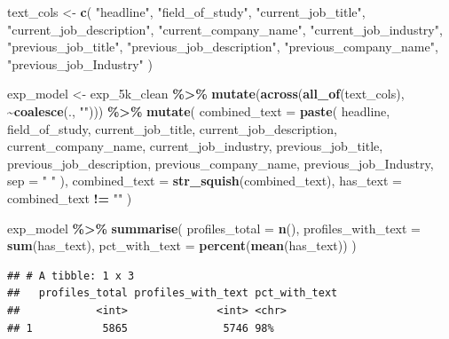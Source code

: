 \documentclass[
]{article}
\newenvironment{Shaded}{\begin{snugshade}}{\end{snugshade}}
\newcommand{\AttributeTok}[1]{\textcolor[rgb]{0.13,0.29,0.53}{#1}}
\newcommand{\FunctionTok}[1]{\textcolor[rgb]{0.13,0.29,0.53}{\textbf{#1}}}
\newcommand{\NormalTok}[1]{#1}
\newcommand{\OtherTok}[1]{\textcolor[rgb]{0.56,0.35,0.01}{#1}}
\newcommand{\SpecialCharTok}[1]{\textcolor[rgb]{0.81,0.36,0.00}{\textbf{#1}}}
\newcommand{\StringTok}[1]{\textcolor[rgb]{0.31,0.60,0.02}{#1}}
\begin{document}
\begin{Shaded}
\begin{Highlighting}[]
\NormalTok{text\_cols }\OtherTok{\textless{}{-}} \FunctionTok{c}\NormalTok{(}
  \StringTok{"headline"}\NormalTok{,}
  \StringTok{"field\_of\_study"}\NormalTok{,}
  \StringTok{"current\_job\_title"}\NormalTok{,}
  \StringTok{"current\_job\_description"}\NormalTok{,}
  \StringTok{"current\_company\_name"}\NormalTok{,}
  \StringTok{"current\_job\_industry"}\NormalTok{,}
  \StringTok{"previous\_job\_title"}\NormalTok{,}
  \StringTok{"previous\_job\_description"}\NormalTok{,}
  \StringTok{"previous\_company\_name"}\NormalTok{,}
  \StringTok{"previous\_job\_Industry"}
\NormalTok{)}

\NormalTok{exp\_model }\OtherTok{\textless{}{-}}\NormalTok{ exp\_5k\_clean }\SpecialCharTok{\%\textgreater{}\%}
  \FunctionTok{mutate}\NormalTok{(}\FunctionTok{across}\NormalTok{(}\FunctionTok{all\_of}\NormalTok{(text\_cols), }\SpecialCharTok{\textasciitilde{}}\FunctionTok{coalesce}\NormalTok{(., }\StringTok{""}\NormalTok{))) }\SpecialCharTok{\%\textgreater{}\%}
  \FunctionTok{mutate}\NormalTok{(}
    \AttributeTok{combined\_text =} \FunctionTok{paste}\NormalTok{(}
\NormalTok{      headline,}
\NormalTok{      field\_of\_study,}
\NormalTok{      current\_job\_title,}
\NormalTok{      current\_job\_description,}
\NormalTok{      current\_company\_name,}
\NormalTok{      current\_job\_industry,}
\NormalTok{      previous\_job\_title,}
\NormalTok{      previous\_job\_description,}
\NormalTok{      previous\_company\_name,}
\NormalTok{      previous\_job\_Industry,}
      \AttributeTok{sep =} \StringTok{" "}
\NormalTok{    ),}
    \AttributeTok{combined\_text =} \FunctionTok{str\_squish}\NormalTok{(combined\_text),}
    \AttributeTok{has\_text =}\NormalTok{ combined\_text }\SpecialCharTok{!=} \StringTok{""}
\NormalTok{  )}

\NormalTok{exp\_model }\SpecialCharTok{\%\textgreater{}\%}
  \FunctionTok{summarise}\NormalTok{(}
    \AttributeTok{profiles\_total =} \FunctionTok{n}\NormalTok{(),}
    \AttributeTok{profiles\_with\_text =} \FunctionTok{sum}\NormalTok{(has\_text),}
    \AttributeTok{pct\_with\_text =} \FunctionTok{percent}\NormalTok{(}\FunctionTok{mean}\NormalTok{(has\_text))}
\NormalTok{  )}
\end{Highlighting}
\end{Shaded}

\begin{verbatim}
## # A tibble: 1 x 3
##   profiles_total profiles_with_text pct_with_text
##            <int>              <int> <chr>        
## 1           5865               5746 98%
\end{verbatim}
\end{document}
